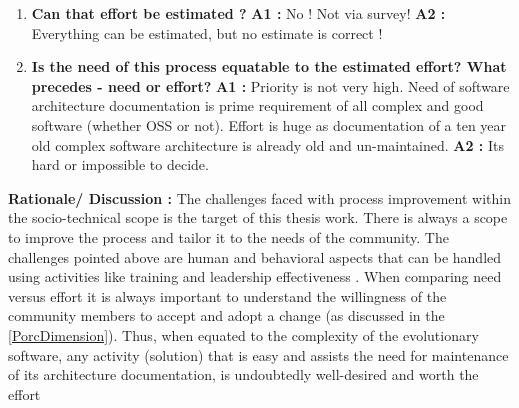 \begin{enumerate}
\item \textbf{Can that effort be estimated ?}
\newline \textbf{A1 :} No ! Not via survey!
\newline \textbf{A2 :} Everything can be estimated, but no estimate is correct !
\item \textbf{Is the need of this process equatable to the estimated effort? What precedes - need or effort?}
\newline \textbf{A1 :} Priority is not very high. Need of software architecture documentation is prime requirement of all complex and good software (whether OSS or not).
\newline Effort is huge as documentation of a ten year old complex software architecture is already old and un-maintained.
\newline \textbf{A2 :} Its hard or impossible to decide.
\end{enumerate}
\textbf{Rationale/ Discussion : } The challenges faced with process improvement within the socio-technical scope is the target of this thesis work. There is always a scope to improve the process and tailor it to the needs of the community. The challenges pointed above are human and behavioral aspects that can be handled using activities like training and leadership effectiveness \cite{Viana2012}.
\newline \newline When comparing need versus effort it is always important to understand the willingness of the community members to accept and adopt a change (as discussed in the \autoref{PorcDimension}). Thus, when equated to the complexity of the evolutionary software, any activity (solution) that is easy and assists the need for maintenance of its architecture documentation, is undoubtedly well-desired and worth the effort

